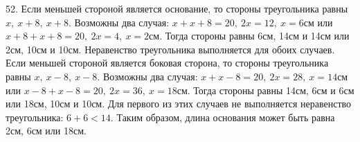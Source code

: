 52. Если меньшей стороной является основание, то стороны треугольника равны $x,\ x+8,\ x+8.$ Возможны два случая: $x+x+8=20,\ 2x=12,\ x=6$см или $x+8+x+8=20,\ 2x=4,\ x=2$см. Тогда стороны равны 6см, 14см и 14см или 2см, 10см и 10см. Неравенство треугольника выполняется для обоих случаев. Если меньшей стороной является боковая сторона, то стороны треугольника равны $x,\ x-8,\ x-8.$ Возможны два случая: $x+x-8=20,\ 2x=28,\ x=14$см или $x-8+x-8=20,\ 2x=36,\ x=18$см. Тогда стороны равны 14см, 6см и 6см или 18см, 10см и 10см. Для первого из этих случаев не выполняется неравенство треугольника: $6+6<14.$ Таким образом, длина основания может быть равна 2см, 6см или 18см.\\
